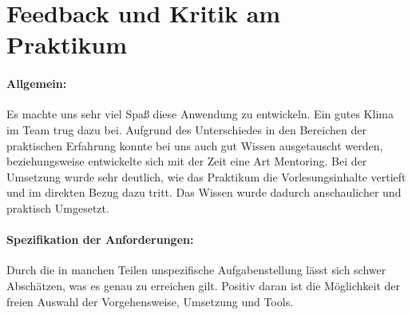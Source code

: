 
\section{Feedback und Kritik am Praktikum}

\paragraph{Allgemein:} Es machte uns sehr viel Spaß diese Anwendung zu entwickeln. Ein gutes Klima im Team trug dazu bei. 
Aufgrund des Unterschiedes in den Bereichen der praktischen Erfahrung konnte bei uns auch gut Wissen ausgetauscht werden, beziehungsweise entwickelte sich mit der Zeit eine Art Mentoring.
Bei der Umsetzung wurde sehr deutlich, wie das Praktikum die Vorlesungsinhalte vertieft und im direkten Bezug dazu tritt. Das Wissen wurde dadurch anschaulicher und praktisch Umgesetzt. 


\paragraph{Spezifikation der Anforderungen:} Durch die in manchen Teilen unspezifische Aufgabenstellung lässt sich schwer Abschätzen, was es genau zu erreichen gilt. Positiv daran ist die Möglichkeit der freien Auswahl der Vorgehensweise, Umsetzung und Tools. 